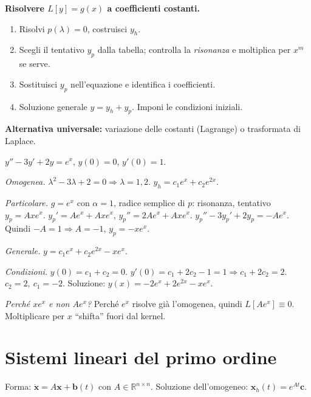 \documentclass[11pt,a4paper,openany]{book}
\theoremstyle{plain}
\theoremstyle{definition}
\theoremstyle{remark}
\newcommand{\R}{\mathbb{R}}
\renewcommand{\vec}[1]{\mathbf{#1}}
\begin{document}
\begin{ricetta}
\textbf{Risolvere $L[y]=g(x)$ a coefficienti costanti.}
\begin{enumerate}[leftmargin=*]
  \item Risolvi $p(\lambda)=0$, costruisci $y_h$.
  \item Scegli il tentativo $y_p$ dalla tabella; controlla la
        \emph{risonanza} e moltiplica per $x^m$ se serve.
  \item Sostituisci $y_p$ nell'equazione e identifica i coefficienti.
  \item Soluzione generale $y=y_h+y_p$. Imponi le condizioni iniziali.
\end{enumerate}
\textbf{Alternativa universale:} variazione delle costanti (Lagrange) o
trasformata di Laplace.
\end{ricetta}

\begin{esempio}
$y''-3y'+2y=e^{x}$, $y(0)=0$, $y'(0)=1$.

\emph{Omogenea.} $\lambda^2-3\lambda+2=0\Rightarrow\lambda=1,2$.
$y_h=c_1 e^{x}+c_2 e^{2x}$.

\emph{Particolare.} $g=e^x$ con $\alpha=1$, radice semplice di $p$:
risonanza, tentativo $y_p=Axe^{x}$.
$y_p'=Ae^{x}+Axe^{x}$, $y_p''=2Ae^x+Axe^x$.
$y_p''-3y_p'+2y_p=-Ae^x$. Quindi $-A=1\Rightarrow A=-1$, $y_p=-xe^x$.

\emph{Generale.} $y=c_1 e^x+c_2 e^{2x}-xe^x$.

\emph{Condizioni.} $y(0)=c_1+c_2=0$. $y'(0)=c_1+2c_2-1=1\Rightarrow c_1+2c_2=2$.
$c_2=2,\ c_1=-2$. Soluzione: $y(x)=-2e^x+2e^{2x}-xe^x$.

\textsl{Perch\'e $xe^x$ e non $Ae^x$?} Perch\'e $e^x$ risolve gi\`a l'omogenea,
quindi $L[Ae^x]\equiv 0$. Moltiplicare per $x$ ``shifta'' fuori dal kernel.
\end{esempio}

\section{Sistemi lineari del primo ordine}

Forma: $\dot{\vec{x}}=A\vec{x}+\vec{b}(t)$ con $A\in\R^{n\times n}$.
Soluzione dell'omogeneo: $\vec{x}_h(t)=e^{At}\vec{c}$.
\end{document}
